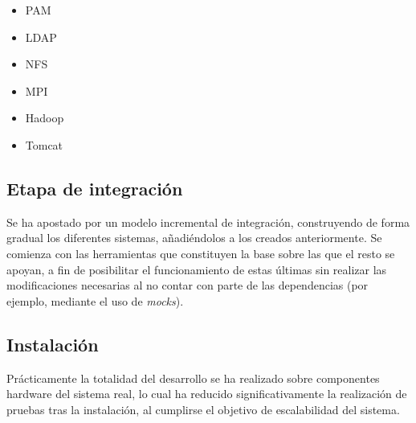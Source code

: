 \documentclass{article}
\begin{document}
\begin{itemize}
\item PAM
\item LDAP
\item NFS
\item MPI
\item Hadoop
\item Tomcat
\end{itemize}

\subsection{Etapa de integración}

Se ha apostado por un modelo incremental de integración, construyendo de forma gradual los diferentes sistemas, añadiéndolos a los creados anteriormente. Se comienza con las herramientas que constituyen la base sobre las que el resto se apoyan, a fin de posibilitar el funcionamiento de estas últimas sin realizar las modificaciones necesarias al no contar con parte de las dependencias (por ejemplo, mediante el uso de \textit{mocks}).

\subsection{Instalación}

Prácticamente la totalidad del desarrollo se ha realizado sobre componentes hardware del sistema real, lo cual ha reducido significativamente la realización de pruebas tras la instalación, al cumplirse el objetivo de escalabilidad del sistema.




\label{Bibliography}
\end{document}
